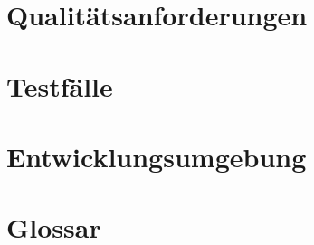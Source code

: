 \documentclass[a4paper,11pt,parskip=half-]{scrartcl}
\begin{document}
	\section{Qualitätsanforderungen}
	
	
	\section{Testfälle}
	
	
	\section{Entwicklungsumgebung}
	
	
	\section{Glossar}
	
	
	
\end{document}
